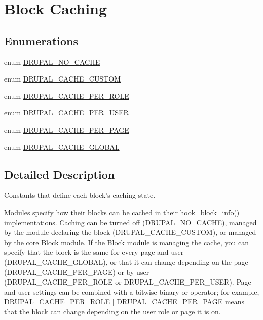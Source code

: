 \hypertarget{group__block__caching}{
\section{Block Caching}
\label{group__block__caching}
}
\subsection*{Enumerations}
\begin{DoxyCompactItemize}
\item 
enum \hyperlink{group__block__caching_ga49931c05c761ec8deb074dde3eb6649c}{DRUPAL\_\-NO\_\-CACHE} 
\item 
enum \hyperlink{group__block__caching_gaca17d982799dd205caa54b00e700db42}{DRUPAL\_\-CACHE\_\-CUSTOM} 
\item 
enum \hyperlink{group__block__caching_ga43d498e9607c4cdeb88d89341e0b3c3c}{DRUPAL\_\-CACHE\_\-PER\_\-ROLE} 
\item 
enum \hyperlink{group__block__caching_gaa50d399158badf0cda6ecbc3ff6707e9}{DRUPAL\_\-CACHE\_\-PER\_\-USER} 
\item 
enum \hyperlink{group__block__caching_gaf5ec7d2a686e7bf3be4cb308bdbe81cc}{DRUPAL\_\-CACHE\_\-PER\_\-PAGE} 
\item 
enum \hyperlink{group__block__caching_gae81ef75e407d08488a85f2b396292ce2}{DRUPAL\_\-CACHE\_\-GLOBAL} 
\end{DoxyCompactItemize}


\subsection{Detailed Description}
Constants that define each block's caching state.

Modules specify how their blocks can be cached in their \hyperlink{group__hooks_ga2bd926c3e90deeba0c3ba64fb3c64d73}{hook\_\-block\_\-info()} implementations. Caching can be turned off (DRUPAL\_\-NO\_\-CACHE), managed by the module declaring the block (DRUPAL\_\-CACHE\_\-CUSTOM), or managed by the core Block module. If the Block module is managing the cache, you can specify that the block is the same for every page and user (DRUPAL\_\-CACHE\_\-GLOBAL), or that it can change depending on the page (DRUPAL\_\-CACHE\_\-PER\_\-PAGE) or by user (DRUPAL\_\-CACHE\_\-PER\_\-ROLE or DRUPAL\_\-CACHE\_\-PER\_\-USER). Page and user settings can be combined with a bitwise-\/binary or operator; for example, DRUPAL\_\-CACHE\_\-PER\_\-ROLE $|$ DRUPAL\_\-CACHE\_\-PER\_\-PAGE means that the block can change depending on the user role or page it is on.

